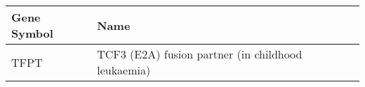 \begin{tabular}{ll}
\toprule
Gene Symbol &                                               Name \\
\midrule
       TFPT & TCF3 (E2A) fusion partner (in childhood leukaemia) \\
\bottomrule
\end{tabular}
